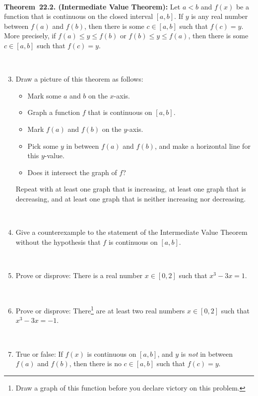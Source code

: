 \documentclass[12pt]{amsart}
\begin{document}
\

\begin{framed} 
\noindent\textbf{Theorem~22.2. (Intermediate Value Theorem):}  Let $a<b$ and $f(x)$ be a function that is continuous on the closed interval $[a,b]$. If $y$ is any real number between $f(a)$ and $f(b)$, then there is some $c\in [a,b]$ such that $f(c)=y$. More precisely, if $f(a) \leq y \leq f(b)$ or $f(b) \leq y \leq f(a)$, then there is some $c\in [a,b]$ such that $f(c)=y$.
\end{framed}

\


\begin{enumerate}\setcounter{enumi}{2}
\item Draw a picture of this theorem as follows: 
\begin{itemize}
\item Mark some $a$ and $b$ on the $x$-axis. 
\item Graph a function $f$ that is continuous on $[a,b]$.
\item Mark $f(a)$ and $f(b)$ on the $y$-axis.
\item Pick some $y$ in between  $f(a)$ and $f(b)$, and make a horizontal line for this $y$-value.
\item Does it intersect the graph of $f$?
\end{itemize}
Repeat with at least one graph that is increasing, at least one graph that is decreasing, and at least one graph that is neither increasing nor decreasing.

\

\item  Give a counterexample to the statement of the Intermediate Value Theorem without the hypothesis that $f$ is continuous on $[a,b]$.

\

\item Prove or disprove: There is a real number $x\in [0,2]$ such that $x^3 - 3x = 1$.

\

\item Prove or disprove: There\footnote{Draw a graph of this function before you declare victory on this problem.} are at least two real numbers $x\in [0,2]$ such that $x^3 - 3x = -1$.

\

\item True or false: If $f(x)$ is continuous on $[a,b]$, and $y$ is \emph{not} in between $f(a)$ and $f(b)$, then there is no $c\in[a,b]$ such that $f(c) = y$.


\end{enumerate}
\end{document}
